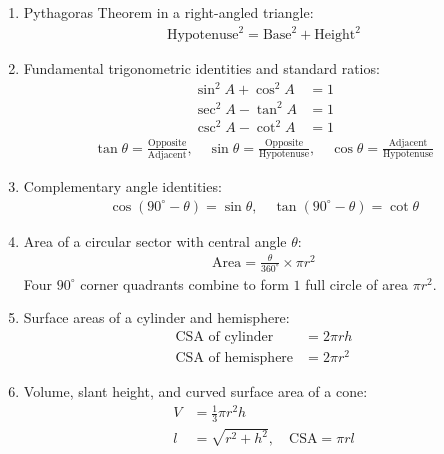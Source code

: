 \begin{enumerate}[label=\thesubsection.\arabic*, ref=\thesubsection.\theenumi]
    \item Pythagoras Theorem in a right-angled triangle:
\begin{align}
    \text{Hypotenuse}^2 = \text{Base}^2 + \text{Height}^2 \label{eq:EE26BTECH11225-pythagoras}
\end{align}

    \item Fundamental trigonometric identities and standard ratios:
\begin{align}
    \sin^2 A + \cos^2 A &= 1 \label{eq:EE26BTECH11225-trig-1} \\
    \sec^2 A - \tan^2 A &= 1 \label{eq:EE26BTECH11225-trig-2} \\
    \csc^2 A - \cot^2 A &= 1 \label{eq:EE26BTECH11225-trig-3}
\end{align}
\begin{align}
    \tan\theta = \frac{\text{Opposite}}{\text{Adjacent}}, \quad \sin\theta = \frac{\text{Opposite}}{\text{Hypotenuse}}, \quad \cos\theta = \frac{\text{Adjacent}}{\text{Hypotenuse}} \label{eq:EE26BTECH11225-trig-ratios}
\end{align}

    \item Complementary angle identities:
\begin{align}
    \cos(90^\circ - \theta) = \sin\theta, \quad \tan(90^\circ - \theta) = \cot\theta \label{eq:EE26BTECH11225-complementary}
\end{align}

    \item Area of a circular sector with central angle $\theta$:
\begin{align}
    \text{Area} = \frac{\theta}{360^\circ} \times \pi r^2 \label{eq:EE26BTECH11225-sector}
\end{align}
Four $90^\circ$ corner quadrants combine to form $1$ full circle of area $\pi r^2$.

    \item Surface areas of a cylinder and hemisphere:
\begin{align}
    \text{CSA of cylinder} &= 2\pi rh \label{eq:EE26BTECH11225-csa-cyl} \\
    \text{CSA of hemisphere} &= 2\pi r^2 \label{eq:EE26BTECH11225-csa-hemi}
\end{align}

    \item Volume, slant height, and curved surface area of a cone:
\begin{align}
    V &= \frac{1}{3}\pi r^2 h \label{eq:EE26BTECH11225-cone-vol} \\
    l &= \sqrt{r^2 + h^2}, \quad \text{CSA} = \pi r l \label{eq:EE26BTECH11225-cone-csa}
\end{align}


\end{enumerate}
